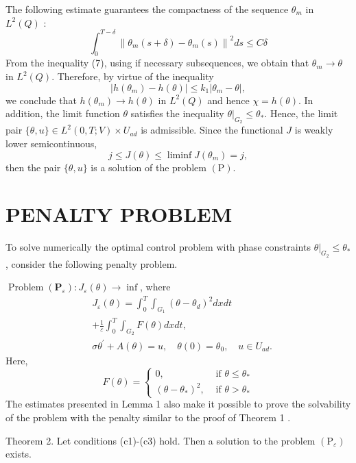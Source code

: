 \documentclass[10pt]{article}
\begin{document}
The following estimate guarantees the compactness of the sequence $\theta_{m}$ in $L^{2}(Q)$ :
$$
\int_{0}^{T-\delta}\left\|\theta_{m}(s+\delta)-\theta_{m}(s)\right\|^{2} d s \leq C \delta
$$
From the inequality (7), using if necessary subsequences, we obtain that $\theta_{m} \rightarrow \theta$ in $L^{2}(Q)$. Therefore, by virtue of the inequality
$$
\left|h\left(\theta_{m}\right)-h(\theta)\right| \leq k_{1}\left|\theta_{m}-\theta\right|,
$$
we conclude that $h\left(\theta_{m}\right) \rightarrow h(\theta)$ in $L^{2}(Q)$ and hence $\chi=h(\theta)$. In addition, the limit function $\theta$ satisfies the inequality $\left.\theta\right|_{G_{2}} \leq \theta_{*}$. Hence, the limit pair $\{\theta, u\} \in L^{2}(0, T ; V) \times U_{a d}$ is admissible. Since the functional $J$ is weakly lower semicontinuous,
$$
j \leq J(\theta) \leq \liminf J\left(\theta_{m}\right)=j,
$$
then the pair $\{\theta, u\}$ is a solution of the problem $(\mathrm{P})$.

\section{PENALTY PROBLEM}
To solve numerically the optimal control problem with phase constraints $\left.\theta\right|_{G_{2}} \leq \theta_{*}$, consider the following penalty problem.

$\operatorname{Problem}\left(\mathbf{P}_{\varepsilon}\right): J_{\varepsilon}(\theta) \rightarrow \inf$, where
$$
\begin{aligned}
& J_{\varepsilon}(\theta)=\int_{0}^{T} \int_{G_{1}}\left(\theta-\theta_{d}\right)^{2} d x d t \\
& +\frac{1}{\varepsilon} \int_{0}^{T} \int_{G_{2}} F(\theta) d x d t, \\
& \sigma \theta^{\prime}+A(\theta)=u, \quad \theta(0)=\theta_{0}, \quad u \in U_{a d} .
\end{aligned}
$$
Here,
$$
F(\theta)= \begin{cases}0, & \text { if } \theta \leq \theta_{*} \\ \left(\theta-\theta_{*}\right)^{2}, & \text { if } \theta>\theta_{*}\end{cases}
$$
The estimates presented in Lemma 1 also make it possible to prove the solvability of the problem with the penalty similar to the proof of Theorem 1 .

Theorem 2. Let conditions (c1)-(c3) hold. Then a solution to the problem $\left(\mathrm{P}_{\varepsilon}\right)$ exists.
\end{document}
